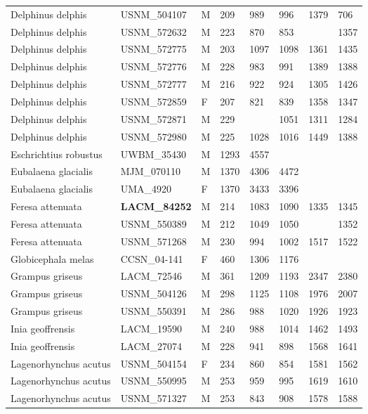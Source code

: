 \begin{longtable}{|p{1in}p{1in}p{.15in}p{.4in}p{.4in}p{.5in}p{.5in}p{.75in}|}
  Delphinus delphis & USNM\_504107 & M & 209 & 989 & 996 & 1379 & 706 \\ 
  Delphinus delphis & USNM\_572632 & M & 223 & 870 & 853 &  & 1357 \\ 
  Delphinus delphis & USNM\_572775 & M & 203 & 1097 & 1098 & 1361 & 1435 \\ 
  Delphinus delphis & USNM\_572776 & M & 228 & 983 & 991 & 1389 & 1388 \\ 
  Delphinus delphis & USNM\_572777 & M & 216 & 922 & 924 & 1305 & 1426 \\ 
  Delphinus delphis & USNM\_572859 & F & 207 & 821 & 839 & 1358 & 1347 \\ 
  Delphinus delphis & USNM\_572871 & M & 229 &  & 1051 & 1311 & 1284 \\ 
  Delphinus delphis & USNM\_572980 & M & 225 & 1028 & 1016 & 1449 & 1388 \\ 
  Eschrichtius robustus & UWBM\_35430 & M & 1293 & 4557 &  &  &  \\ 
  Eubalaena glacialis & MJM\_070110 & M & 1370 & 4306 & 4472 &  &  \\ 
  Eubalaena glacialis & UMA\_4920 & F & 1370 & 3433 & 3396 &  &  \\ 
  Feresa attenuata & \textbf{ LACM\_84252 } & M & 214 & 1083 & 1090 & 1335 & 1345 \\ 
  Feresa attenuata & USNM\_550389 & M & 212 & 1049 & 1050 &  & 1352 \\ 
  Feresa attenuata & USNM\_571268 & M & 230 & 994 & 1002 & 1517 & 1522 \\ 
  Globicephala melas & CCSN\_04-141 & F & 460 & 1306 & 1176 &  &  \\ 
  Grampus griseus & LACM\_72546 & M & 361 & 1209 & 1193 & 2347 & 2380 \\ 
  Grampus griseus & USNM\_504126 & M & 298 & 1125 & 1108 & 1976 & 2007 \\ 
  Grampus griseus & USNM\_550391 & M & 286 & 988 & 1020 & 1926 & 1923 \\ 
  Inia geoffrensis & LACM\_19590 & M & 240 & 988 & 1014 & 1462 & 1493 \\ 
  Inia geoffrensis & LACM\_27074 & M & 228 & 941 & 898 & 1568 & 1641 \\ 
  Lagenorhynchus acutus & USNM\_504154 & F & 234 & 860 & 854 & 1581 & 1562 \\ 
  Lagenorhynchus acutus & USNM\_550995 & M & 253 & 959 & 995 & 1619 & 1610 \\ 
  Lagenorhynchus acutus & USNM\_571327 & M & 253 & 843 & 908 & 1578 & 1588 \\ 

\end{longtable}
